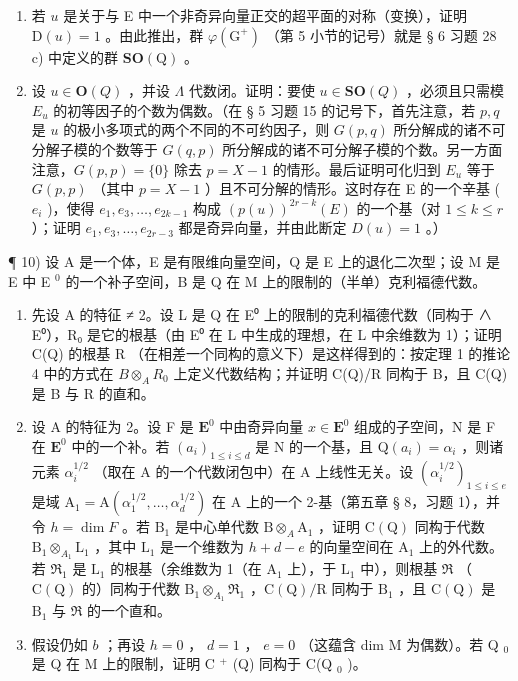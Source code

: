 \begin{enumerate}
\def\labelenumi{\alph{enumi})}
\setcounter{enumi}{3}
\item
  若 \(u\) 是关于与 E 中一个非奇异向量正交的超平面的对称（变换），证明 \(\mathrm{D}(u)=1\) 。由此推出，群 \(\varphi(\mathrm{G}^{+})\) （第 5 小节的记号）就是 § 6 习题 28 c) 中定义的群 \(\mathbf{SO}(\mathrm{Q})\) 。
\item
  设 \(u \in \mathbf{O}(Q)\) ，并设 \(\Lambda\) 代数闭。证明：要使 \(u \in \mathbf{SO}(Q)\) ，必须且只需模 \(E_u\) 的初等因子的个数为偶数。（在 § 5 习题 15 的记号下，首先注意，若 \(p, q\) 是 \(u\) 的极小多项式的两个不同的不可约因子，则 \(G(p, q)\) 所分解成的诸不可分解子模的个数等于 \(G(q, p)\) 所分解成的诸不可分解子模的个数。另一方面注意，\(G(p, p) = \{0\}\) 除去 \(p = X - 1\) 的情形。最后证明可化归到 \(E_u\) 等于 \(G(p, p)\) （其中 \(p = X - 1\) ）且不可分解的情形。这时存在 E 的一个辛基 ( \(e_i\) )，使得 \(e_1, e_3, \ldots, e_{2k-1}\) 构成 \((p(u))^{2r-k}(E)\) 的一个基（对 \(1 \leqslant k \leqslant r\) ）；证明 \(e_1, e_3, \ldots, e_{2r-3}\) 都是奇异向量，并由此断定 \(D(u) = 1\) 。）
\end{enumerate}

¶ 10) 设 A 是一个体，E 是有限维向量空间，Q 是 E 上的退化二次型；设 M 是 E 中 E \(^{0}\) 的一个补子空间，B 是 Q 在 M 上的限制的（半单）克利福德代数。

\begin{enumerate}
\def\labelenumi{\alph{enumi})}
\item
  先设 A 的特征 ≠ 2。设 L 是 Q 在 E⁰ 上的限制的克利福德代数（同构于 ∧ E⁰），R₀ 是它的根基（由 E⁰ 在 L 中生成的理想，在 L 中余维数为 1）；证明 C(Q) 的根基 R （在相差一个同构的意义下）是这样得到的：按定理 1 的推论 4 中的方式在 \(B \otimes_{A} R_{0}\) 上定义代数结构；并证明 C(Q)/R 同构于 B，且 C(Q) 是 B 与 R 的直和。
\item
  设 A 的特征为 2。设 F 是 \(\mathbf{E}^0\) 中由奇异向量 \(x \in \mathbf{E}^0\) 组成的子空间，N 是 F 在 \(\mathbf{E}^0\) 中的一个补。若 \((a_i)_{1 \leqslant i \leqslant d}\) 是 N 的一个基，且 \(\mathrm{Q}(a_i) = \alpha_i\) ，则诸元素 \(\alpha_i^{1/2}\) （取在 A 的一个代数闭包中）在 A 上线性无关。设 \((\alpha_i^{1/2})_{1 \leqslant i \leqslant e}\) 是域 \(\mathrm{A}_1 = \mathrm{A}(\alpha_1^{1/2}, \ldots, \alpha_d^{1/2})\) 在 A 上的一个 2-基（第五章 § 8，习题 1），并令 \(h = \dim F\) 。若 \(\mathrm{B}_1\) 是中心单代数 \(\mathrm{B} \otimes_{A} \mathrm{A}_1\) ，证明 \(\mathrm{C(Q)}\) 同构于代数 \(\mathrm{B}_1 \otimes_{A_1} \mathrm{L}_1\) ，其中 \(\mathrm{L}_1\) 是一个维数为 \(h + d - e\) 的向量空间在 \(\mathrm{A}_1\) 上的外代数。若 \(\Re_1\) 是 \(\mathrm{L}_1\) 的根基（余维数为 1（在 \(\mathrm{A}_1\) 上），于 \(\mathrm{L}_1\) 中），则根基 \(\Re\) （\(\mathrm{C(Q)}\) 的）同构于代数 \(\mathrm{B}_1 \otimes_{A_1} \Re_1\) ，\(\mathrm{C(Q)/R}\) 同构于 \(\mathrm{B}_1\) ，且 \(\mathrm{C(Q)}\) 是 \(\mathrm{B}_1\) 与 \(\Re\) 的一个直和。
\item
  假设仍如 \(b\) ；再设 \(h=0\) ， \(d=1\) ， \(e=0\) （这蕴含 dim M 为偶数）。若 Q \(_{0}\) 是 Q 在 M 上的限制，证明 C \(^{+}\) (Q) 同构于 C(Q \(_{0}\) )。
\end{enumerate}

